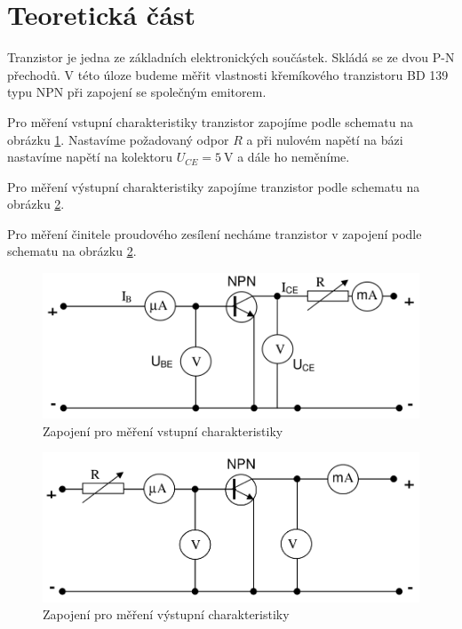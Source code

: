 \section*{Teoretická část}
Tranzistor je jedna ze základních elektronických součástek.
Skládá se ze dvou P-N přechodů.
V této úloze budeme měřit vlastnosti křemíkového tranzistoru BD 139 typu NPN při zapojení se společným emitorem.

Pro měření vstupní charakteristiky tranzistor zapojíme podle schematu na obrázku \ref{obr:schemavstup}.
Nastavíme požadovaný odpor $R$ a při nulovém napětí na bázi nastavíme napětí na kolektoru $U_{CE} = \SI{5}{\volt}$ a dále ho neměníme.


Pro měření výstupní charakteristiky zapojíme tranzistor podle schematu na obrázku \ref{obr:schemavystup}.

Pro měření činitele proudového zesílení necháme tranzistor v zapojení podle schematu na obrázku \ref{obr:schemavystup}.


\begin{figure}[htbp]
\centering
\includegraphics[width=\textwidth-2cm]{graficos/vstup}
\caption{Zapojení pro měření vstupní charakteristiky\cite{skripta}}
\label{obr:schemavstup}
\end{figure}

\begin{figure}[htbp]
\centering
\includegraphics[width=\textwidth-2cm]{graficos/vystup}
\caption{Zapojení pro měření výstupní charakteristiky\cite{skripta}}
\label{obr:schemavystup}
\end{figure}